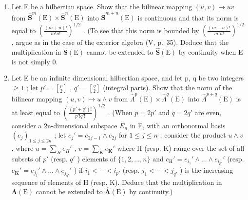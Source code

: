 \begin{enumerate}
\def\labelenumi{\arabic{enumi})}
\tightlist
\item
  Let E be a hilbertian space. Show that the bilinear mapping \((u, v) \mapsto uv\) from \(\hat{\mathbf{S}}^{m}(\mathrm{E}) \times \hat{\mathbf{S}}^{n}(\mathrm{E})\) into \(\hat{\mathbf{S}}^{m+n}(\mathrm{E})\) is continuous and that its norm is equal to \(\left(\frac{(m+n)!}{m! n!}\right)^{1/2}\) . (To see that this norm is bounded by \(\left(\frac{(m+n)!}{m! n!}\right)^{1/2}\) , argue as in the case of the exterior algebra (V, p.~35). Deduce that the multiplication in \(\mathbf{S}(\mathrm{E})\) cannot be extended to \(\hat{\mathbf{S}}(\mathrm{E})\) by continuity when E is not simply 0.
\item
  Let E be an infinite dimensional hilbertian space, and let p, q be two integers \(\geqslant 1\) ; let \(p' = \left[\frac{p}{2}\right]\) , \(q' = \left[\frac{q}{2}\right]\) (integral parts). Show that the norm of the bilinear mapping \((u, v) \mapsto u \wedge v\) from \(\hat{\Lambda}^{p}(\mathrm{E}) \times \hat{\Lambda}^{q}(\mathrm{E})\) into \(\hat{\Lambda}^{p+q}(\mathrm{E})\) is at least equal to \(\left(\frac{(p' + q')!}{p'! q'!}\right)^{1/2}\) . (When \(p = 2p'\) and \(q = 2q'\) are even, consider a 2n-dimensional subspace \(E_{n}\) in E, with an orthonormal basis \((e_{j})_{1 \leqslant j \leqslant 2n}\) ; let \(e_{j}' = e_{2j-1} \wedge e_{2j}\) for \(1 \leqslant j \leqslant n\) ; consider the product \(u \wedge v\) , where \(u = \sum_{H} e_{H}'\) , \(v = \sum_{\mathbf{K}} e_{\mathbf{K}}'\) where H (resp. K) range over the set of all subsets of \(p'\) (resp. \(q'\) ) elements of \(\{1, 2, ..., n\}\) and \(e_{\mathrm{H}}' = e_{i_1}' \wedge ... \wedge e_{i_{p'}}'\) (resp. \(e_{\mathbf{K}}' = e_{j_1}' \wedge ... \wedge e_{j_{q'}}'\) ) if \(i_1 < \cdots < i_{p'}\) (resp. \(j_1 < \cdots < j_{q'}\) ) is the increasing sequence of elements of H (resp. K). Deduce that the multiplication in \(\boldsymbol{\Lambda}(\mathrm{E})\) cannot be extended to \(\hat{\boldsymbol{\Lambda}}(\mathrm{E})\) by continuity.)
\end{enumerate}
